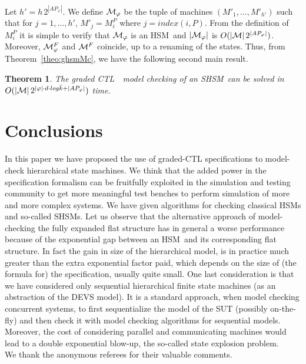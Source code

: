 \documentclass[letterpaper,twocolumn,10pt]{article}
\newtheorem{theorem}{Theorem}
\def    \ctl        {\mbox{\textsc{CTL }\xspace}}
\def    \M          {{\cal M}}
\newcommand{\VHSM}{SHSM}
\newcommand{\HSM}{HSM}
\begin{document}
Let $h'=h\,2^{|AP_\varphi|}$. We define $\M_\varphi$ be the tuple of
machines $(M'_1,\ldots,M'_{h'})$
such that for $j=1,\ldots,h'$, $M'_j=M^P_i$ where $j=index(i,P)$.
From the definition of $M^P_i$ it is simple to verify that $\M_\varphi$
is an \HSM\ and $|\M_\varphi|$ is $O(|\M|\,2^{|AP_\varphi|})$.
Moreover, $\M_\varphi^F$ and $\M^F$ coincide,
up to a renaming of the states.
Thus, from Theorem~\ref{theo:ghsmMc}, we have the following second main result.
\begin{theorem}\label{theo:gshsmMc}
The graded \ctl\ model checking of an \VHSM\ can be solved in
$O(|\M| \, 2^{|\varphi|\cdot d \cdot log\bar k + |AP_\varphi|})$ time.
\end{theorem}

\section{Conclusions}\label{sec:Conclusions}
In this paper we have proposed the use of graded-CTL specifications to model-check
hierarchical state machines. We think that the added power in the specification formalism can be fruitfully
exploited in the simulation and testing community to get more meaningful test benches to
perform simulation of more and more complex systems.
We have given algorithms for checking classical \HSM s and so-called \VHSM s.
Let us observe that the alternative approach of model-checking the
fully expanded flat structure
has in general a worse performance because of the exponential gap between an \HSM\ and its corresponding
flat structure. In fact the gain in size of the hierarchical model, is in practice
much greater than the extra exponential factor paid, which depends on the size of (the formula for)
the spe\-ci\-fication, usually quite small.
One last consideration is that we have considered only sequential hierarchical finite state
machines (as an abstraction of the DEVS model).
It is a standard approach, when model checking concurrent systems, to first sequentialize
the model of the SUT (possibly on-the-fly) and then check it with model checking algorithms
for sequential models.
Moreover, the cost of considering
parallel and communicating machines would lead to a double exponential blow-up, the so-called
state explosion problem.
\\ We thank the anonymous referees for their valuable
comments.

\end{document}
